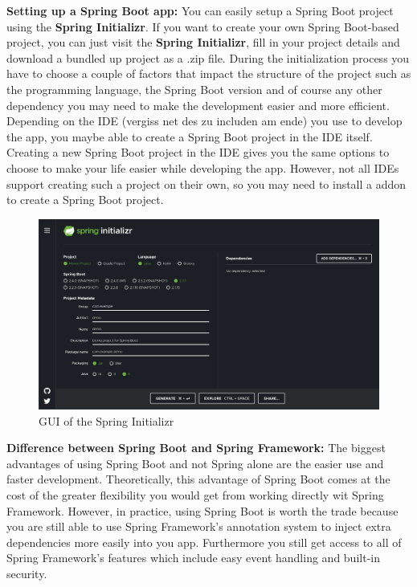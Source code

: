     \textbf{Setting up a Spring Boot app:} \newline
    You can easily setup a Spring Boot project using the \textbf{Spring Initializr}. If you want to create your own Spring Boot-based project, you can just visit the \textbf{Spring Initializr}, fill in your project details and download a bundled up project as a .zip file. During the initialization process you have to choose a couple of factors that impact the structure of the 
    project such as the programming language, the Spring Boot version and of course any other dependency you may need to make the development easier and more efficient.
    Depending on the IDE (vergiss net des zu includen am ende) you use to develop the app, you maybe able to create a Spring Boot project in the IDE itself. Creating a new Spring Boot project in the IDE gives you the same options to choose to make your life easier while developing the app. However, not all IDEs support creating such a project
    on their own, so you may need to install a addon to create a Spring Boot project.

    \begin{figure} [H]
        \centering
        \includegraphics [width=1\textwidth] {images/andreas/springFramework/springInit.jpg}
        \caption{GUI of the Spring Initializr}
    \end{figure}
    
    \textbf{Difference between Spring Boot and Spring Framework:} \newline
    The biggest advantages of using Spring Boot and not Spring alone are the easier use and faster development. Theoretically, this advantage of Spring Boot comes at the cost of the greater flexibility you would get from working directly wit Spring Framework. However, in practice, using Spring Boot is worth the trade because you are still able to use
    Spring Framework's annotation system to inject extra dependencies more easily into you app. Furthermore you still get access to all of Spring Framework's features which include easy event handling and built-in security. 
    
